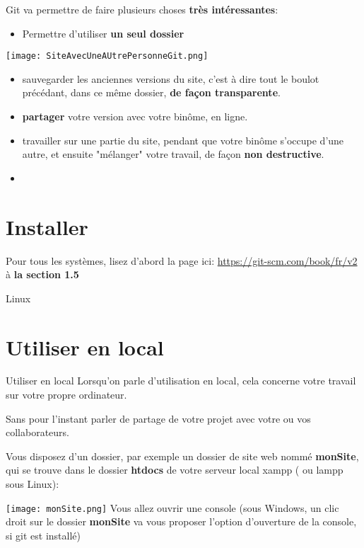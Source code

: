\documentclass[10pt]{beamer}
\begin{document}
\begin{frame}
Git va permettre de faire plusieurs choses \textbf{très intéressantes}:
\begin{itemize}
\item Permettre d'utiliser \textbf{un seul dossier}
\end{itemize}
\texttt{[image: SiteAvecUneAUtrePersonneGit.png]}

\begin{itemize}
\item sauvegarder les anciennes versions du site, c'est à dire tout le boulot précédant, dans ce même dossier, \textbf{de façon transparente}.
\item \textbf{partager} votre version avec votre binôme, en ligne.
\item travailler sur une partie du site, pendant que votre binôme s'occupe d'une autre, et ensuite "mélanger" votre travail, de façon \textbf{non destructive}.
\item 
\end{itemize}

\end{frame}

\begin{frame}

\end{frame}


\section{Installer}

\begin{frame}
Pour tous les systèmes, lisez d'abord la page ici:
\url{https://git-scm.com/book/fr/v2} à \textbf{la section 1.5}
\end{frame}

\begin{frame}{Linux}

\end{frame}


\section{Utiliser en local}


\begin{frame}{Utiliser en local}
Lorsqu'on parle d'utilisation en local, cela concerne votre travail sur votre propre ordinateur.

Sans pour l'instant parler de partage de votre projet avec votre ou vos collaborateurs.

Vous disposez d'un dossier, par exemple un dossier de site web nommé \textbf{monSite}, qui se trouve dans le dossier \textbf{htdocs} de votre serveur local xampp ( ou lampp sous Linux):

\texttt{[image: monSite.png]}
Vous allez ouvrir une console (sous Windows, un clic droit sur le dossier \textbf{monSite} va vous proposer l'option d'ouverture de la console, si git est installé)
\end{frame}
\end{document}
